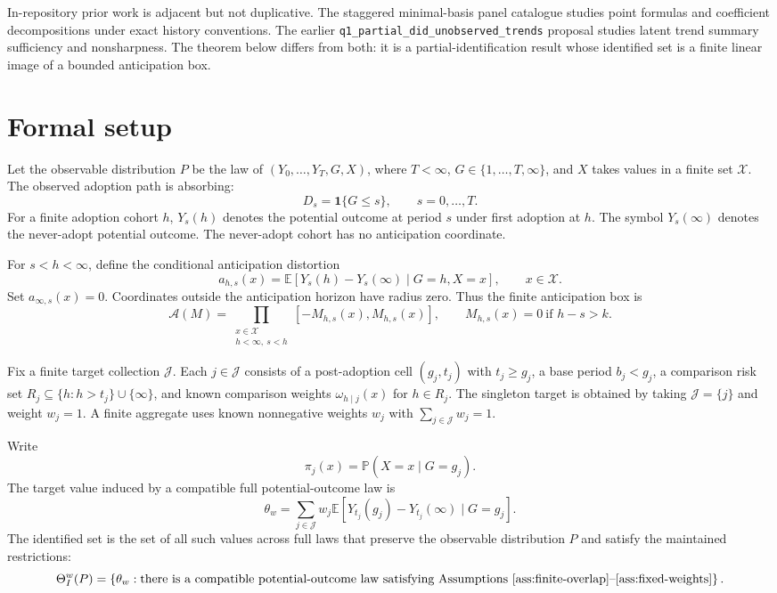 \documentclass[11pt]{article}
\newcommand{\E}{\mathbb{E}}
\renewcommand{\Pr}{\mathbb{P}}
\newcommand{\one}{\mathbf{1}}
\theoremstyle{definition}
\theoremstyle{plain}
\theoremstyle{remark}
\begin{document}
In-repository prior work is adjacent but not duplicative.  The staggered
minimal-basis panel catalogue studies point formulas and coefficient
decompositions under exact history conventions.  The earlier
\texttt{q1\_partial\_did\_unobserved\_trends} proposal studies latent trend
summary sufficiency and nonsharpness.  The theorem below differs from both:
it is a partial-identification result whose identified set is a finite linear
image of a bounded anticipation box.

\section{Formal setup}
Let the observable distribution \(P\) be the law of
\((Y_0,\ldots,Y_T,G,X)\), where \(T<\infty\),
\(G\in\{1,\ldots,T,\infty\}\), and \(X\) takes values in a finite set
\(\mathcal{X}\).  The observed adoption path is absorbing:
\[
  D_s=\one\{G\le s\},\qquad s=0,\ldots,T.
\]
For a finite adoption cohort \(h\), \(Y_s(h)\) denotes the potential outcome at
period \(s\) under first adoption at \(h\).  The symbol \(Y_s(\infty)\) denotes
the never-adopt potential outcome.  The never-adopt cohort has no anticipation
coordinate.

For \(s<h<\infty\), define the conditional anticipation distortion
\[
  a_{h,s}(x)
  =
  \E[Y_s(h)-Y_s(\infty)\mid G=h,X=x],
  \qquad x\in\mathcal{X}.
\]
Set \(a_{\infty,s}(x)=0\).  Coordinates outside the anticipation horizon have
radius zero.  Thus the finite anticipation box is
\[
  \mathcal{A}(M)
  =
  \prod_{\substack{x\in\mathcal{X}\\ h<\infty,\ s<h}}
  [-M_{h,s}(x),M_{h,s}(x)],
  \qquad
  M_{h,s}(x)=0\ \text{if }h-s>k.
\]

Fix a finite target collection \(\mathcal{J}\).  Each
\(j\in\mathcal{J}\) consists of a post-adoption cell
\((g_j,t_j)\) with \(t_j\ge g_j\), a base period \(b_j<g_j\), a comparison risk
set \(R_j\subseteq\{h:h>t_j\}\cup\{\infty\}\), and known comparison weights
\(\omega_{h\mid j}(x)\) for \(h\in R_j\).  The singleton target is obtained by
taking \(\mathcal{J}=\{j\}\) and weight \(w_j=1\).  A finite aggregate uses known
nonnegative weights \(w_j\) with \(\sum_{j\in\mathcal{J}}w_j=1\).

Write
\[
  \pi_j(x)=\Pr(X=x\mid G=g_j).
\]
The target value induced by a compatible full potential-outcome law is
\[
  \theta_w
  =
  \sum_{j\in\mathcal{J}}w_j
  \E[Y_{t_j}(g_j)-Y_{t_j}(\infty)\mid G=g_j].
\]
The identified set is the set of all such values across full laws that preserve
the observable distribution \(P\) and satisfy the maintained restrictions:
\[
  \Theta_I^w(P)
  =
  \left\{\theta_w:
  \text{there is a compatible potential-outcome law satisfying
  Assumptions~\ref{ass:finite-overlap}--\ref{ass:fixed-weights}}\right\}.
\]
\end{document}
